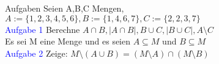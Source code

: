 \begin{frame}{Aufgaben}
	Seien A,B,C Mengen, $A := \{1, 2, 3, 4, 5, 6\}, B := \{1, 4, 6, 7\}, C := \{2, 2, 3, 7\}$\\
	\textcolor{blue}{Aufgabe 1} Berechne $A\cap B, \lvert A\cap B\rvert, B\cup C, \lvert B\cup C\rvert, A\setminus C$\\
	Es sei M eine Menge und es seien $A\subseteq M$ und $B\subseteq M$\\
	\textcolor{blue}{Aufgabe 2} Zeige: $M\setminus (A\cup B) = (M\setminus A)\cap (M\setminus B)$\\
\end{frame}
